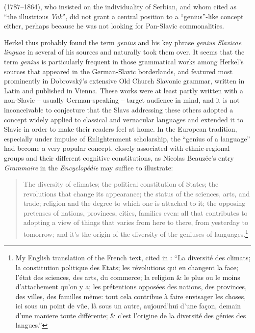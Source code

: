 (1787--1864), who insisted on the individuality of Serbian, and whom \citet[51]{herkel_elementa_1826} cited as “the illustrious \textit{Vuk}”, did not grant a central position to a “genius”-like concept either, perhaps because he was not looking for Pan-Slavic commonalities.

Herkel thus probably found the term \textit{genius} and his key phrase \textit{genius Slavicae linguae} in several of his sources and naturally took them over. It seems that the term \textit{genius} is particularly frequent in those grammatical works among Herkel’s sources that appeared in the German-Slavic borderlands, and featured most prominently in Dobrovský’s extensive Old Church Slavonic grammar, written in Latin and published in Vienna. These works were at least partly written with a non-Slavic – usually German-speaking – target audience in mind, and it is not inconceivable to conjecture that the Slavs addressing these others adopted a concept widely applied to classical and vernacular languages and extended it to Slavic in order to make their readers feel at home. In the European tradition, especially under impulse of Enlightenment scholarship, the “genius of a language” had become a very popular concept, closely associated with ethnic-regional groups and their different cognitive constitutions, as Nicolas Beauzée’s entry \textit{Grammaire} in the \textit{Encyclopédie} may suffice to illustrate:

\begin{quote}
    The diversity of climates; the political constitution of States; the revolutions that change its appearance; the status of the sciences, arts, and trade; religion and the degree to which one is attached to it; the opposing pretenses of nations, provinces, cities, families even: all that contributes to adopting a view of things that varies from here to there, from yesterday to tomorrow; and it’s the origin of the diversity of the geniuses of languages.\footnote{My English translation of the French text, cited in \citet[780]{hasler_reichtum_2009}: “La diversité des climats; la constitution politique des Etats; les révolutions qui en changent la face; l’état des sciences, des arts, du commerce; la religion \& le plus ou le moins d’attachement qu’on y a; les prétentions opposées des nations, des provinces, des villes, des familles même: tout cela contribue à faire envisager les choses, ici sous un point de vûe, là sous un autre, aujourd’hui d’une façon, demain d’une maniere toute différente; \& c’est l’origine de la diversité des génies des langues.”}
\end{quote}

